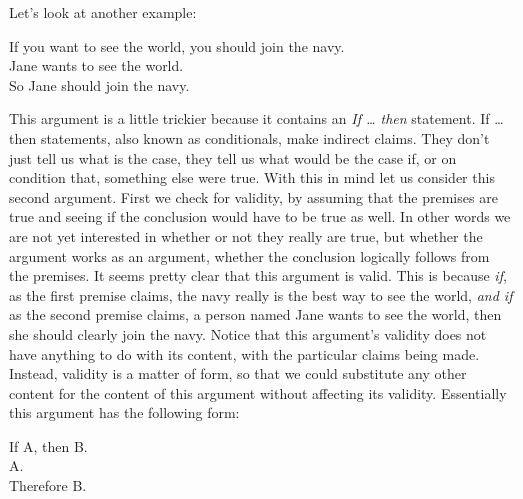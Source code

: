 \documentclass[12pt, openany]{book}
\begin{document}
Let's look at another example:

\begin{center}

\begin{argument}

If you want to see the world, you should join the navy.\\
Jane wants to see the world.\\

So Jane should join the navy.

\end{argument}

\end{center}

This argument is a little trickier because it contains an \emph{If \ldots{} then} statement. If \ldots{} then statements, also known as conditionals, make indirect claims. They don't just tell us what is the case, they tell us what would be the case if, or on condition that, something else were true. With this in mind let us consider this second argument. First we check for validity, by assuming that the premises are true and seeing if the conclusion would have to be true as well. In other words we are not yet interested in whether or not they really are true, but whether the argument works as an argument, whether the conclusion logically follows from the premises. It seems pretty clear that this argument is valid. This is because \emph{if}, as the first premise claims, the navy really is the best way to see the world, \emph{and if} as the second premise claims, a person named Jane wants to see the world, then she should clearly join the navy. Notice that this argument's validity does not have anything to do with its content, with the particular claims being made. Instead, validity is a matter of form, so that we could substitute any other content for the content of this argument without affecting its validity. Essentially this argument has the following form:

\begin{center}

\begin{argument}

If A, then B.\\
A.\\

Therefore B.

\end{argument}

\end{center}
\end{document}
